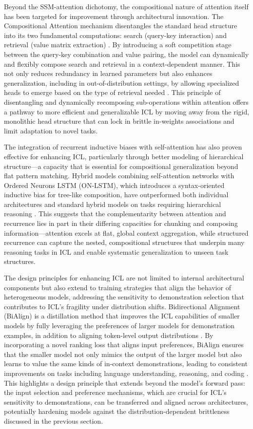 \documentclass[11pt]{article}
\begin{document}
Beyond the SSM-attention dichotomy, the compositional nature of attention itself has been targeted for improvement through architectural innovation. The Compositional Attention mechanism disentangles the standard head structure into its two fundamental computations: search (query-key interaction) and retrieval (value matrix extraction) \cite{ref120}. By introducing a soft competition stage between the query-key combination and value pairing, the model can dynamically and flexibly compose search and retrieval in a context-dependent manner. This not only reduces redundancy in learned parameters but also enhances generalization, including in out-of-distribution settings, by allowing specialized heads to emerge based on the type of retrieval needed \cite{ref120}. This principle of disentangling and dynamically recomposing sub-operations within attention offers a pathway to more efficient and generalizable ICL by moving away from the rigid, monolithic head structure that can lock in brittle in-weights associations and limit adaptation to novel tasks.

The integration of recurrent inductive biases with self-attention has also proven effective for enhancing ICL, particularly through better modeling of hierarchical structure---a capacity that is essential for compositional generalization beyond flat pattern matching. Hybrid models combining self-attention networks with Ordered Neurons LSTM (ON-LSTM), which introduces a syntax-oriented inductive bias for tree-like composition, have outperformed both individual architectures and standard hybrid models on tasks requiring hierarchical reasoning \cite{ref121}. This suggests that the complementarity between attention and recurrence lies in part in their differing capacities for chunking and composing information---attention excels at flat, global context aggregation, while structured recurrence can capture the nested, compositional structures that underpin many reasoning tasks in ICL and enable systematic generalization to unseen task structures.

The design principles for enhancing ICL are not limited to internal architectural components but also extend to training strategies that align the behavior of heterogeneous models, addressing the sensitivity to demonstration selection that contributes to ICL's fragility under distribution shifts. Bidirectional Alignment (BiAlign) is a distillation method that improves the ICL capabilities of smaller models by fully leveraging the preferences of larger models for demonstration examples, in addition to aligning token-level output distributions \cite{ref122}. By incorporating a novel ranking loss that aligns input preferences, BiAlign ensures that the smaller model not only mimics the output of the larger model but also learns to value the same kinds of in-context demonstrations, leading to consistent improvements on tasks including language understanding, reasoning, and coding \cite{ref122}. This highlights a design principle that extends beyond the model's forward pass: the input selection and preference mechanisms, which are crucial for ICL's sensitivity to demonstrations, can be transferred and aligned across architectures, potentially hardening models against the distribution-dependent brittleness discussed in the previous section.
\end{document}
